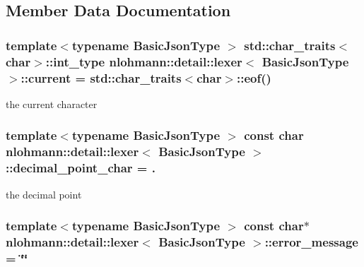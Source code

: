\subsection{Member Data Documentation}
\subsubsection[{\texorpdfstring{current}{current}}]{\setlength{\rightskip}{0pt plus 5cm}template$<$typename Basic\+Json\+Type $>$ std\+::char\+\_\+traits$<$char$>$\+::int\+\_\+type {\bf nlohmann\+::detail\+::lexer}$<$ Basic\+Json\+Type $>$\+::current = std\+::char\+\_\+traits$<$char$>$\+::eof()\hspace{0.3cm}{\ttfamily [private]}}\hypertarget{classnlohmann_1_1detail_1_1lexer_a47169f9aaf0da4c9885e61d3109859aa}{}\label{classnlohmann_1_1detail_1_1lexer_a47169f9aaf0da4c9885e61d3109859aa}


the current character 

\subsubsection[{\texorpdfstring{decimal\+\_\+point\+\_\+char}{decimal_point_char}}]{\setlength{\rightskip}{0pt plus 5cm}template$<$typename Basic\+Json\+Type $>$ const char {\bf nlohmann\+::detail\+::lexer}$<$ Basic\+Json\+Type $>$\+::decimal\+\_\+point\+\_\+char = \textquotesingle{}.\textquotesingle{}\hspace{0.3cm}{\ttfamily [private]}}\hypertarget{classnlohmann_1_1detail_1_1lexer_a16593b0475f6d1cddd5eaf7c045771f3}{}\label{classnlohmann_1_1detail_1_1lexer_a16593b0475f6d1cddd5eaf7c045771f3}


the decimal point 

\subsubsection[{\texorpdfstring{error\+\_\+message}{error_message}}]{\setlength{\rightskip}{0pt plus 5cm}template$<$typename Basic\+Json\+Type $>$ const char$\ast$ {\bf nlohmann\+::detail\+::lexer}$<$ Basic\+Json\+Type $>$\+::error\+\_\+message = \char`\"{}\char`\"{}\hspace{0.3cm}{\ttfamily [private]}}\hypertarget{classnlohmann_1_1detail_1_1lexer_ae2a15e440f1889e0ab0c6a35344e48df}{}\label{classnlohmann_1_1detail_1_1lexer_ae2a15e440f1889e0ab0c6a35344e48df}


